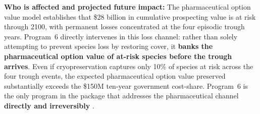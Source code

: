 \documentclass[10pt,letterpaper]{article}
\begin{document}
\begin{tcolorbox}[title=Program 6: Pharmaceutical Biodiversity Prospecting Fund --- \$15M Annual Total,
  colback=teal!5, colframe=teal!60!black, fonttitle=\bfseries, breakable]
  \medskip
  \textbf{Who is affected and projected future impact:} The pharmaceutical option value model establishes that \$28 billion in cumulative prospecting value is at risk through 2100, with permanent losses concentrated at the four episodic trough years. Program~6 directly intervenes in this loss channel: rather than solely attempting to prevent species loss by restoring cover, it \textbf{banks the pharmaceutical option value of at-risk species before the trough arrives}. Even if cryopreservation captures only 10\% of species at risk across the four trough events, the expected pharmaceutical option value preserved substantially exceeds the \$150M ten-year government cost-share. Program~6 is the only program in the package that addresses the pharmaceutical channel \textbf{directly and irreversibly} \cite{simpson1996, costello2006, newman2016}.
\end{tcolorbox}

\medskip
\end{document}
